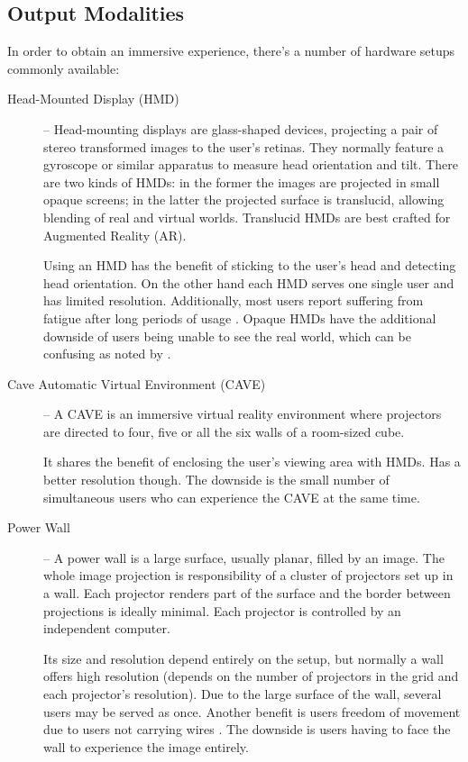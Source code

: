 \subsection{Output Modalities}


In order to obtain an immersive experience, there's a number of hardware
setups commonly available:

\begin{description}
	\item[Head-Mounted Display (HMD)] --
	  Head-mounting displays are glass-shaped devices, projecting a pair of stereo
	  transformed images to the user's retinas.
	  They normally feature a gyroscope or similar apparatus to measure head orientation and tilt.
	  There are two kinds of HMDs: in the former the images are projected in small opaque screens;
	  in the latter the projected surface is translucid, allowing blending of real and virtual worlds.
	  Translucid HMDs are best crafted for Augmented Reality (AR).
	  
		Using an HMD has the benefit of sticking to the user's head and detecting head orientation.
		On the other hand each HMD serves one single user and has limited resolution.
		Additionally, most users report suffering from fatigue after long periods of
		usage \cite{VREDUC}.
		Opaque HMDs have the additional downside of users being unable to see the real world, 
		which can be confusing as noted by \cite{VANDERPOL}.
			
	\item[Cave Automatic Virtual Environment (CAVE)] --
	  A CAVE is an immersive virtual reality environment where projectors are directed to four,
	  five or all the six walls of a room-sized cube.
	  
		It shares the benefit of enclosing the user's viewing area with HMDs.
		Has a better resolution though.
		The downside is the small number of simultaneous users who can experience the CAVE at the same time.
	
	\item[Power Wall] --
	  A power wall is a large surface, usually planar, filled by an image.
	  The whole image projection is responsibility of a cluster of projectors set up in a wall.
	  Each projector renders part of the surface and the border between projections is ideally minimal.
	  Each projector is controlled by an independent computer.
	  
		Its size and resolution depend entirely on the setup, but normally a wall offers high resolution
		(depends on the number of projectors in the grid and each projector's resolution).
		Due to the large surface of the wall, several users may be served as once. Another benefit
		is users freedom of movement due to users not carrying wires \cite{INTTABLE}.
		The downside is users having to face the wall to experience the image entirely.
\end{description}

